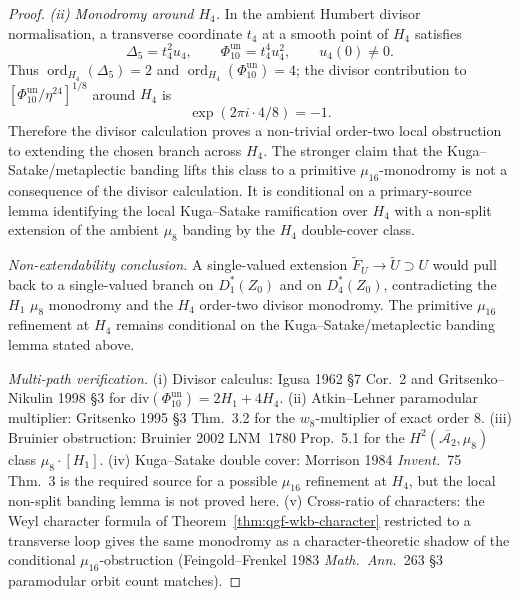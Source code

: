 \begin{proof}
\emph{(ii) Monodromy around $H_4$.} In the ambient Humbert divisor
normalisation, a transverse coordinate $t_4$ at a smooth point of $H_4$
satisfies
\[
 \Delta_5=t_4^2 u_4,\qquad
 \Phi_{10}^{\mathrm{un}}=t_4^4u_4^2,
 \qquad u_4(0)\neq0.
\]
Thus $\operatorname{ord}_{H_4}(\Delta_5)=2$ and
$\operatorname{ord}_{H_4}(\Phi_{10}^{\mathrm{un}})=4$; the divisor
contribution to $[\Phi_{10}^{\mathrm{un}}/\eta^{24}]^{1/8}$ around
$H_4$ is
\[
 \exp(2\pi i\cdot4/8)=-1 .
\]
Therefore the divisor calculation proves a non-trivial order-two local
obstruction to extending the chosen branch across $H_4$. The stronger
claim that the Kuga--Satake/metaplectic banding lifts this class to a
primitive $\mu_{16}$-monodromy is not a consequence of the divisor
calculation. It is conditional on a primary-source lemma identifying the
local Kuga--Satake ramification over $H_4$ with a non-split extension of
the ambient $\mu_8$ banding by the $H_4$ double-cover class.

\emph{Non-extendability conclusion.} A single-valued extension
$\widetilde F_U\to\widetilde U\supset U$ would pull back to a
single-valued branch on $D^*_1(Z_0)$ and on $D^*_4(Z_0)$, contradicting
the $H_1$ $\mu_8$ monodromy and the $H_4$ order-two divisor monodromy.
The primitive $\mu_{16}$ refinement at $H_4$ remains conditional on the
Kuga--Satake/metaplectic banding lemma stated above.

\emph{Multi-path verification.}
(i) Divisor calculus: Igusa 1962 \S7 Cor.~2 and
Gritsenko--Nikulin 1998 \S3 for
 $\mathrm{div}(\Phi_{10}^{\mathrm{un}}) = 2H_1+4H_4$.
(ii) Atkin--Lehner paramodular multiplier: Gritsenko 1995 \S3 Thm.~3.2
 for the $w_8$-multiplier of exact order $8$.
(iii) Bruinier obstruction: Bruinier 2002 LNM~1780 Prop.~5.1 for the
 $H^2(\overline{\mathcal A_2}, \mu_8)$ class $\mu_8\cdot[H_1]$.
(iv) Kuga--Satake double cover: Morrison 1984 \emph{Invent.}~75 Thm.~3
 is the required source for a possible $\mu_{16}$ refinement at $H_4$,
 but the local non-split banding lemma is not proved here.
(v) Cross-ratio of characters: the Weyl character formula of
 Theorem~\ref{thm:qgf-wkb-character} restricted to a
 transverse loop gives the same monodromy as a character-theoretic
 shadow of the conditional $\mu_{16}$-obstruction (Feingold--Frenkel
 1983 \emph{Math.\ Ann.}~263 \S3 paramodular orbit count matches).
\end{proof}

